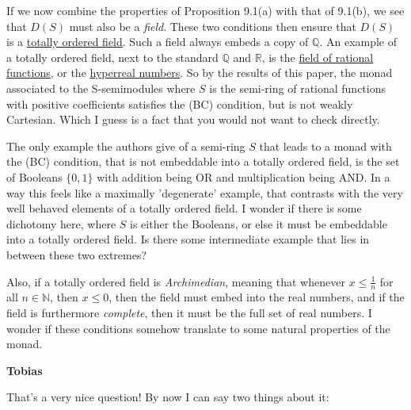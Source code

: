 \documentclass{amsart}
\newcommand{\respond}[1]{
  \vspace{1em} \textbf{#1}
}
\begin{document}
If we now combine the properties of Proposition 9.1(a) with that of 9.1(b), we see that $D(S)$ must also be a \emph{field}. These two conditions then ensure that $D(S)$ is a \href{https://en.wikipedia.org/wiki/Ordered_field}{totally ordered field}. Such a field always embeds a copy of $\mathbb{Q}$. An example of a totally ordered field, next to the standard $\mathbb{Q}$ and $\mathbb{R}$, is the \href{https://en.wikipedia.org/wiki/Archimedean_property#Non-Archimedean_ordered_field}{field of rational functions}, or the \href{https://en.wikipedia.org/wiki/Non-Archimedean_ordered_field}{hyperreal numbers}. So by the results of this paper, the monad associated to the S-semimodules where $S$ is the semi-ring of rational functions with positive coefficients satisfies the (BC) condition, but is not weakly Cartesian. Which I guess is a fact that you would not want to check directly.

The only example the authors give of a semi-ring $S$ that leads to a monad with the (BC) condition, that is not embeddable into a totally ordered field, is the set of Booleans $\{0,1\}$ with addition being OR and multiplication being AND. In a way this feels like a maximally 'degenerate' example, that contrasts with the very well behaved elements of a totally ordered field. I wonder if there is some dichotomy here, where $S$ is either the Booleans, or else it must be embeddable into a totally ordered field. Is there some intermediate example that lies in between these two extremes?

Also, if a totally ordered field is \emph{Archimedian}, meaning that whenever $x\leq \frac{1}{n}$ for all $n\in \mathbb{N}$, then $x\leq 0$, then the field must embed into the real numbers, and if the field is furthermore \emph{complete}, then it must be the full set of real numbers. I wonder if these conditions somehow translate to some natural properties of the monad.

\respond{Tobias}

That's a very nice question! By now I can say two things about it:
\end{document}
